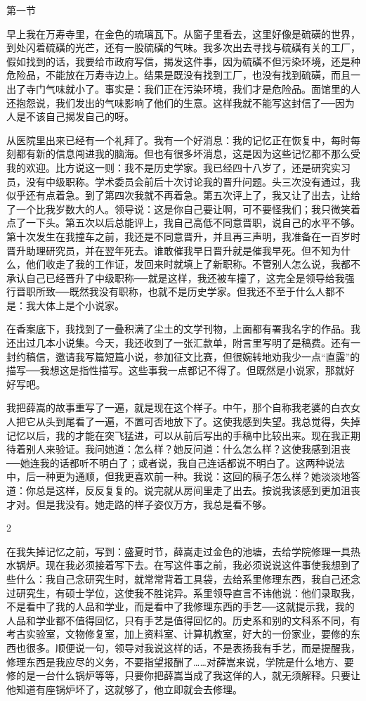 第一节 

早上我在万寿寺里，在金色的琉璃瓦下。从窗子里看去，这里好像是硫磺的世界，到处闪着硫磺的光芒，还有一股硫磺的气味。我多次出去寻找与硫磺有关的工厂，假如找到的话，我要给市政府写信，揭发这件事，因为硫磺不但污染环境，还是种危险品，不能放在万寿寺边上。结果是既没有找到工厂，也没有找到硫磺，而且一出了寺门气味就小了。事实是：我们正在污染环境，我们才是危险品。面馆里的人还抱怨说，我们发出的气味影响了他们的生意。这样我就不能写这封信了──因为人是不该自己揭发自己的呀。 

从医院里出来已经有一个礼拜了。我有一个好消息：我的记忆正在恢复中，每时每刻都有新的信息闯进我的脑海。但也有很多坏消息，这是因为这些记忆都不那么受我的欢迎。比方说这一则：我不是历史学家。我已经四十八岁了，还是研究实习员，没有中级职称。学术委员会前后十次讨论我的晋升问题。头三次没有通过，我似乎还有点着急。到了第四次我就不再着急。第五次评上了，我又让了出去，让给了一个比我岁数大的人。领导说：这是你自己要让啊，可不要怪我们；我只微笑着点了一下头。第五次以后总能评上，我自己高低不同意晋职，说自己的水平不够。第十次发生在我撞车之前，我还是不同意晋升，并且再三声明，我准备在一百岁时晋升助理研究员，并在翌年死去。谁敢催我早日晋升就是催我早死。但不知为什么，他们收走了我的工作证，发回来时就填上了新职称。不管别人怎么说，我都不承认自己已经晋升了中级职称──就是这样，我还被车撞了，这完全是领导给我强行晋职所致──既然我没有职称，也就不是历史学家。但我还不至于什么人都不是：我大体上是个小说家。 

在香案底下，我找到了一叠积满了尘土的文学刊物，上面都有署我名字的作品。我还出过几本小说集。今天，我还收到了一张汇款单，附言里写明了是稿费。还有一封约稿信，邀请我写篇短篇小说，参加征文比赛，但很婉转地劝我少一点“直露”的描写──我想这是指性描写。这些事我一点都记不得了。但既然是小说家，那就好好写吧。 

我把薛嵩的故事重写了一遍，就是现在这个样子。中午，那个自称我老婆的白衣女人把它从头到尾看了一遍，不置可否地放下了。这使我感到失望。我总觉得，失掉记忆以后，我的才能在突飞猛进，可以从前后写出的手稿中比较出来。现在我正期待着别人来验证。我问她道：怎么样？她反问道：什么怎么样？这使我感到沮丧──她连我的话都听不明白了；或者说，我自己连话都说不明白了。这两种说法中，后一种更为通顺，但我更喜欢前一种。我说：这回的稿子怎么样？她淡淡地答道：你总是这样，反反复复的。说完就从房间里走了出去。按说我该感到更加沮丧才对。但是我没有。她走路的样子姿仪万方，我总是看不够。 

2 

在我失掉记忆之前，写到：盛夏时节，薛嵩走过金色的池塘，去给学院修理一具热水锅炉。现在我必须接着写下去。在写这件事之前，我必须说说这件事使我想到了些什么：我自己念研究生时，就常常背着工具袋，去给系里修理东西，我自己还念过研究生，有硕士学位，这使我不胜诧异。系里领导直言不讳他说：他们录取我，不是看中了我的人品和学业，而是看中了我修理东西的手艺──这就提示我，我的人品和学业都不值得回忆，只有手艺是值得回忆的。历史系和别的文科系不同，有考古实验室，文物修复室，加上资料室、计算机教室，好大的一份家业，要修的东西也很多。顺便说一句，领导对我说这样的话，不是表扬我有手艺，而是提醒我，修理东西是我应尽的义务，不要指望报酬了……对薛嵩来说，学院是什么地方、要修的是一台什么锅炉等等，只要你把薛嵩当成了我这佯的人，就无须解释。只要让他知道有座锅炉坏了，这就够了，他立即就会去修理。 

